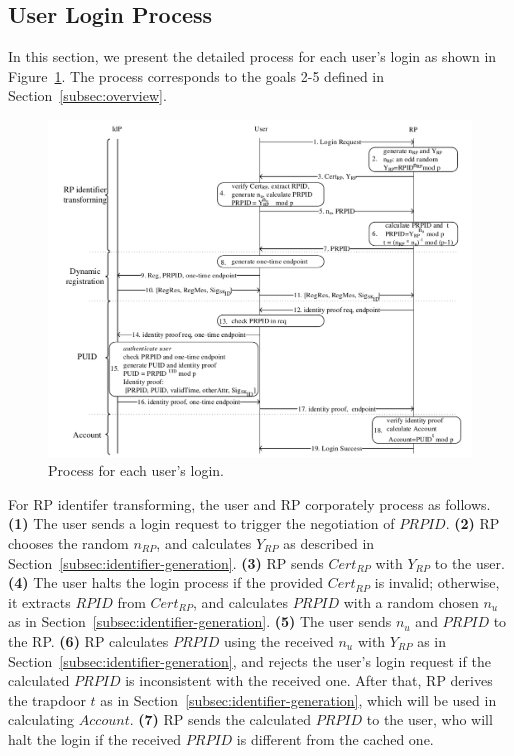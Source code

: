 \subsection{User Login Process}
\label{sebsec:loginprocess}
In this section, we present the detailed process for each user's login as shown in Figure~\ref{fig:process}. The process corresponds to the goals 2-5 defined in Section~\ref{subsec:overview}.

\begin{figure}
  \centering
  \includegraphics[width=0.85\linewidth]{fig/process.pdf}
  \caption{Process for each user's login.}
  \label{fig:process}
\end{figure}

For RP identifer transforming, the user and RP corporately process as follows. \textbf{(1)} The user sends a login request to trigger the negotiation of $PRPID$. \textbf{(2)} RP chooses the random $n_{RP}$, and calculates $Y_{RP}$ as described in Section~\ref{subsec:identifier-generation}. \textbf{(3)} RP sends $Cert_{RP}$ with $Y_{RP}$ to the user.  \textbf{(4)} The user halts the login process if the provided $Cert_{RP}$ is invalid; otherwise, it extracts $RPID$ from $Cert_{RP}$, and calculates $PRPID$ with a random chosen $n_u$ as in Section~\ref{subsec:identifier-generation}. \textbf{(5)} The user sends $n_u$ and $PRPID$ to the RP. \textbf{(6)} RP calculates $PRPID$ using the received $n_u$ with $Y_{RP}$ as in Section~\ref{subsec:identifier-generation}, and rejects the user's login request if the calculated $PRPID$ is inconsistent with the received one. After that, RP derives the trapdoor $t$ as in Section~\ref{subsec:identifier-generation}, which will be used in calculating $Account$. \textbf{(7)} RP sends the calculated $PRPID$ to the user, who will halt the login if the received $PRPID$ is different from the cached one.

